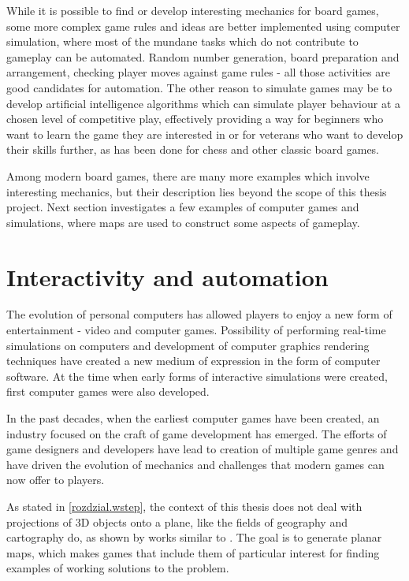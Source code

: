 \documentclass[12pt]{report}
\begin{document}
While it is possible to find or develop interesting mechanics for board games, some more complex game rules and ideas are better implemented using computer simulation, where most of the mundane tasks which do not contribute to gameplay can be automated. Random number generation, board preparation and arrangement, checking player moves against game rules - all those activities are good candidates for automation. The other reason to simulate games may be to develop artificial intelligence algorithms which can simulate player behaviour at a chosen level of competitive play, effectively providing a way for beginners who want to learn the game they are interested in or for veterans who want to develop their skills further, as has been done for chess and other classic board games. 

Among modern board games, there are many more examples which involve interesting mechanics, but their description lies beyond the scope of this thesis project. Next section investigates a few examples of computer games and simulations, where maps are used to construct some aspects of gameplay.

\section{Interactivity and automation }

The evolution of personal computers has allowed players to enjoy a new form of entertainment - video and computer games. Possibility of performing real-time simulations on computers and development of computer graphics rendering techniques have created a new medium of expression in the form of computer software. At the time when early forms of interactive simulations were created, first computer games were also developed. 

In the past decades, when the earliest computer games have been created, an industry focused on the craft of game development has emerged. The efforts of game designers and developers have lead to creation of multiple game genres and have driven the evolution of mechanics and challenges that modern games can now offer to players.

As stated in \cref{rozdzial.wstep}, the context of this thesis does not deal with projections of 3D objects onto a plane, like the fields of geography and cartography do, as shown by works similar to \autocite{snyder1993flattening}. The goal is to generate planar maps, which makes games that include them of particular interest for finding examples of working solutions to the problem. 
\end{document}
